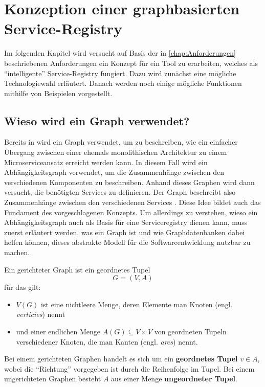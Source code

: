 \chapter{Konzeption einer graphbasierten Service-Registry}

Im folgenden Kapitel wird versucht auf Basis der in \vref{chap:Anforderungen} beschriebenen Anforderungen ein Konzept für ein Tool zu erarbeiten, welches als \enquote{intelligente} Service-Registry fungiert. Dazu wird zunächst eine mögliche Technologiewahl erläutert. Danach werden noch einige mögliche Funktionen mithilfe von Beispielen vorgestellt.

\section{Wieso wird ein Graph verwendet?}

Bereits in \citeauthor{Ren2018} wird ein Graph verwendet, um zu beschreiben, wie ein einfacher Übergang zwischen einer ehemals monolithischen Architektur zu einem Microserviceansatz erreicht werden kann. In diesem Fall wird ein Abhängigkeitsgraph verwendet, um die Zusammenhänge zwischen den verschiedenen Komponenten zu beschreiben. Anhand dieses Graphen wird dann versucht, die benötigten Services zu definieren. Der Graph beschreibt also Zusammenhänge zwischen den verschiedenen Services \autocite[Kapitel 3.2 \& Kapitel 3.3]{Ren2018}. Diese Idee bildet auch das Fundament des vorgeschlagenen Konzepts. Um allerdings zu verstehen, wieso ein Abhängigkeitsgraph auch als Basis für eine Serviceregistry dienen kann, muss zuerst erläutert werden, was ein Graph ist und wie Graphdatenbanken dabei helfen können, dieses abstrakte Modell für die Softwareentwicklung nutzbar zu machen.

\begin{definition}\autocite[Kapitel 1.2]{Bang-Jensen2007}
	Ein gerichteter Graph ist ein geordnetes Tupel $$G = (V,A)$$ für das gilt:
	\begin{itemize}
		\item $V(G)$ ist eine nichtleere Menge, deren Elemente man Knoten (engl. \textit{verticies}) nennt
		\item und einer endlichen Menge $A(G) \subseteq V \times V$ von geordneten Tupeln verschiedener Knoten, die man Kanten (engl. \textit{arcs}) nennt.
	\end{itemize}

	Bei einem gerichteten Graphen handelt es sich um ein \textbf{geordnetes Tupel} $v \in A$, wobei die \enquote{Richtung} vorgegeben ist durch die Reihenfolge im Tupel. Bei einem ungerichteten Graphen besteht $A$ aus einer Menge \textbf{ungeordneter Tupel}.
\end{definition}

